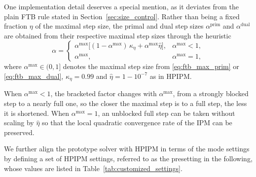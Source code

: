 \documentclass[class=scrbook, crop=false]{standalone}
\begin{document}
One implementation detail deserves a special mention, 
as it deviates from the plain \gls{FTB} rule stated in Section~\ref{sec:size_control}. 
Rather than being a fixed fraction $\eta$ of the maximal step size,
the primal and dual step sizes $\alpha^{\mathrm{prim}}$ and $\alpha^{\mathrm{dual}}$ are obtained 
from their respective maximal step sizes through the heuristic
\begin{equation}
  \alpha =
  \begin{cases}
    \alpha^{\mathrm{max}}\big[(1-\alpha^{\mathrm{max}})\,\kappa_\eta + \alpha^{\mathrm{max}}\hat{\eta}\big], & \alpha^{\mathrm{max}} < 1,\\
    \alpha^{\mathrm{max}}, & \alpha^{\mathrm{max}} = 1,
  \end{cases}
\end{equation}
where $\alpha^{\mathrm{max}}\in(0,1]$ denotes the maximal step size from \eqref{eq:ftb_max_prim} or \eqref{eq:ftb_max_dual},
$\kappa_\eta = 0.99$ and $\hat{\eta} = 1-10^{-7}$ as in HPIPM.

When $\alpha^{\mathrm{max}} < 1$, 
the bracketed factor changes with $\alpha^{\mathrm{max}}$, 
from a strongly blocked step to a nearly full one, so the closer the maximal step is to a full step, the less it is shortened.
When $\alpha^{\mathrm{max}} = 1$,
an unblocked full step can be taken without scaling by $\hat{\eta}$ so that
the local quadratic convergence rate of the \gls{IPM} can be preserved.

We further align the prototype solver with HPIPM in terms of the mode settings by defining a set of HPIPM settings, 
referred to as the presetting in the following, whose values are listed in Table~\ref{tab:customized_settings}.
\end{document}
